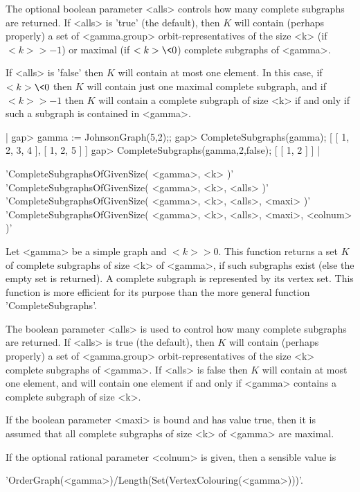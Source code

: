 The   optional  boolean  parameter  <alls>  controls  how  many  complete
subgraphs are returned.  If <alls> is 'true' (the default), then $K$ will
contain (perhaps properly) a  set of  <gamma.group> orbit-representatives
of  the size <k>  (if $<k>  > -1$) or  maximal (if  $<k>  \< 0$) complete
subgraphs of <gamma>.

If <alls> is 'false' then $K$ will contain at most one element.   In this
case, if $<k> \< 0$ then $K$  will  contain  just  one  maximal  complete
subgraph, and if $<k> > -1$ then $K$ will contain  a complete subgraph of
size <k> if and only if such a subgraph is contained in <gamma>.

|    gap> gamma := JohnsonGraph(5,2);;
    gap> CompleteSubgraphs(gamma);
    [ [ 1, 2, 3, 4 ], [ 1, 2, 5 ] ]
    gap> CompleteSubgraphs(gamma,2,false);
    [ [ 1, 2 ] ] |


'CompleteSubgraphsOfGivenSize( <gamma>, <k> )' \\
'CompleteSubgraphsOfGivenSize( <gamma>, <k>, <alls> )' \\
'CompleteSubgraphsOfGivenSize( <gamma>, <k>, <alls>, <maxi> )' \\
'CompleteSubgraphsOfGivenSize( <gamma>, <k>, <alls>, <maxi>, <colnum> )'

Let <gamma> be a simple graph and $<k> > 0$.  This function returns a set
$K$ of complete subgraphs of size <k> of <gamma>, if such subgraphs exist
(else the empty set is returned).  A complete subgraph  is represented by
its vertex set.  This function is more efficient for its purpose than the
more general function 'CompleteSubgraphs'.

The  boolean  parameter  <alls>  is used  to  control  how many  complete
subgraphs are returned.  If <alls> is true  (the  default), then $K$ will
contain (perhaps properly) a set  of <gamma.group>  orbit-representatives
of the  size  <k> complete subgraphs of <gamma>.  If <alls> is false then
$K$ will contain at most one element, and will contain one element if and
only if <gamma> contains a complete subgraph of size <k>.

If the boolean parameter <maxi> is bound and  has value true, then  it is
assumed that all complete subgraphs of size <k> of <gamma> are maximal.

If  the  optional rational parameter  <colnum> is  given, then a sensible
value is
\begin{center}
    'OrderGraph(<gamma>)/Length(Set(VertexColouring(<gamma>)))'.
\end{center}

